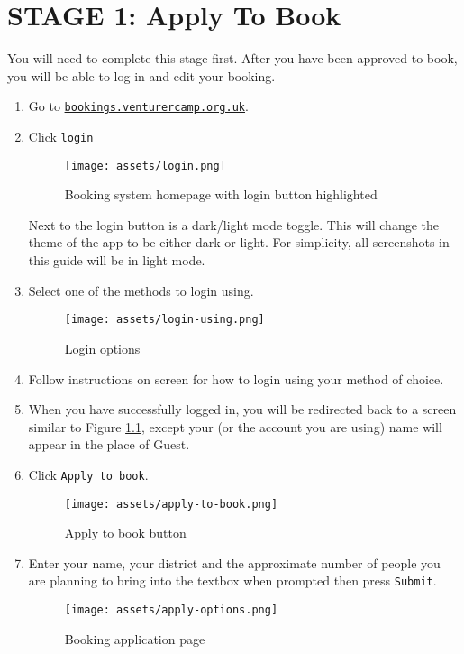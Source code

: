 \chapter{STAGE 1: Apply To Book}
\label{chap:apply}

You will need to complete this stage first. After you have been approved to book, you will be able to log in and edit your booking.

\begin{enumerate}
    \item Go to \href{https://bookings.venturercamp.org.uk/}{\texttt{bookings.venturercamp.org.uk}}.
    \item Click \verb|login|
    \begin{figure}[H]
        \centering
        \texttt{[image: assets/login.png]}
        \caption{Booking system homepage with login button highlighted}
        \label{fig:login}
    \end{figure}
    Next to the login button is a dark/light mode toggle. This will change the theme of the app to be either dark or light. For simplicity, all screenshots in this guide will be in light mode.
    \item Select one of the methods to login using. 
    \begin{figure}[H]
        \centering
        \texttt{[image: assets/login-using.png]}
        \caption{Login options}
    \end{figure}
    \item Follow instructions on screen for how to login using your method of choice.
    \item When you have successfully logged in, you will be redirected back to a screen similar to Figure \ref*{fig:login}, except your (or the account you are using) name will appear in the place of Guest.
    \item Click \verb|Apply to book|.
    \begin{figure}[H]
        \centering
        \texttt{[image: assets/apply-to-book.png]}
        \caption{Apply to book button}
    \end{figure}
    \item Enter your name, your district and the approximate number of people you are planning to bring into the textbox when prompted then press \verb|Submit|.
    \begin{figure}[H]
        \centering
        \texttt{[image: assets/apply-options.png]}
        \caption{Booking application page}

\end{figure}
\end{enumerate}
